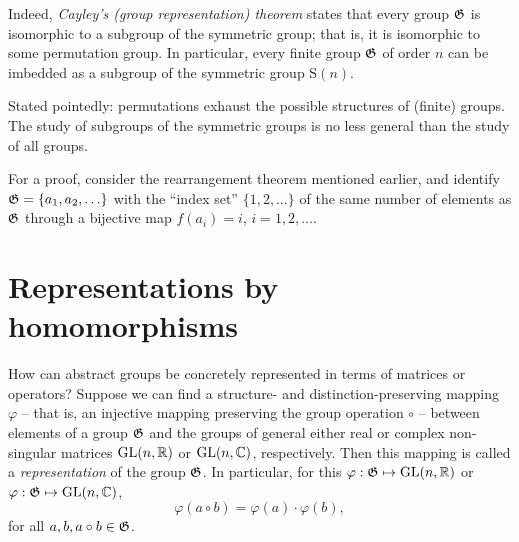 Indeed,  {\em Cayley's (group representation) theorem}
states that every group ${\frak G}$ is isomorphic to a subgroup
of the symmetric group; that is, it is isomorphic to some permutation group.
In particular, every finite group ${\frak G}$ of order $n$  can be imbedded as
a subgroup
of the symmetric group $\textrm{S}(n)$.

Stated pointedly: permutations exhaust the possible structures of (finite) groups.
The study of subgroups of the symmetric groups is no less general than the study of all groups.

{\color{OliveGreen}
\bproof
For a proof, consider the rearrangement theorem mentioned earlier, and identify ${\frak G}=\{a_1,a_2,\ldots\}$
with the ``index set'' $\{1,2,\ldots\}$ of the same number of elements as ${\frak G}$ through a bijective map $f(a_i)=i$,
$i= 1,2, \ldots$.
\eproof
}





\section{Representations by homomorphisms}

How can abstract groups be concretely represented in terms of matrices or operators?
Suppose we can find a structure- and distinction-preserving mapping $\varphi$ -- that is, an injective mapping preserving the group operation $\circ$  --
between elements of a group ${\frak G}$
and the groups of general either real or complex non-singular  matrices $\textrm{GL}(n,{\Bbb R})$ or $\textrm{GL}(n,{\Bbb C})$, respectively.
Then this mapping is called
a {\em representation}
 of the group ${\frak G}$.
In particular,
for this $\varphi  : {\frak G} \mapsto  \textrm{GL}(n,{\Bbb R})$ or $\varphi : {\frak G} \mapsto \textrm{GL}(n,{\Bbb C})$,
\begin{equation}
\varphi (a\circ b)   = \varphi (a)\cdot \varphi (b),
\end{equation}
for all
$a,b, a\circ b \in {\frak G}$.

